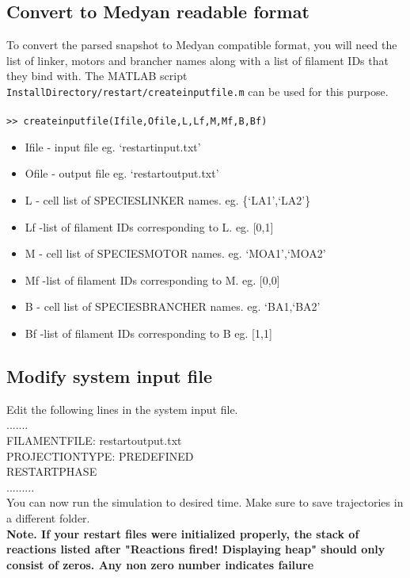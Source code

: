 \documentclass[11pt, oneside]{article}   	%
\begin{document}
\subsection{Convert to Medyan readable format}
To convert the parsed snapshot to Medyan compatible format, you will need the list of linker, motors and brancher names along with a list of filament IDs that they bind with. The MATLAB script \texttt{InstallDirectory/restart/createinputfile.m} can be used for this purpose.\\ \\
\texttt{>> createinputfile(Ifile,Ofile,L,Lf,M,Mf,B,Bf)}\\ 
\begin{itemize}
\item Ifile - input file eg. `restartinput.txt'
 \item Ofile - output file eg. `restartoutput.txt'
 \item L - cell list of SPECIESLINKER names. eg. \{`LA1',`LA2'\}
\item Lf -list of filament IDs corresponding to L. eg. [0,1]
  \item M - cell list of SPECIESMOTOR names. eg. {`MOA1',`MOA2'}
  \item Mf -list of filament IDs corresponding to M. eg. [0,0]
  \item B - cell list of SPECIESBRANCHER names. eg. {`BA1,`BA2'}
 \item Bf -list of filament IDs corresponding to B eg. [1,1]
\end{itemize}
\subsection{Modify system input file}
Edit the following lines in the system input file. \\
\indent .......\\
 \indent FILAMENTFILE:           restartoutput.txt \\
\indent PROJECTIONTYPE:         PREDEFINED \\
\indent RESTARTPHASE \\
\indent .........\\
You can now run the simulation to desired time. Make sure to save trajectories in a different folder.\\
\textbf{Note. If your restart files were initialized properly, the stack of reactions listed after "Reactions fired! Displaying heap" should only consist of zeros. Any non zero number indicates failure}
\end{document}
